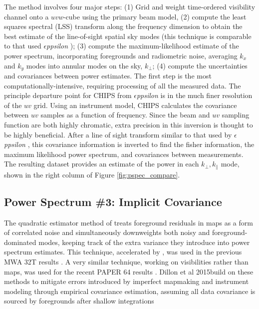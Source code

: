 \documentclass[preprint]{aastex}
\def\eppsilon{{\it $\epsilon$ppsilon }}
\def\dilloncite{Dillon et al 2015}
\begin{document}
The method involves four major steps: (1) Grid and weight time-ordered visibility channel onto a $uvw$-cube using the primary beam model, (2) compute the least squares spectral (LSS) transform along the frequency dimension to obtain the best estimate of the line-of-sight spatial sky modes (this technique is comparable to that used \eppsilon); (3) compute the maximum-likelihood estimate of the power spectrum, incorporating foregrounds and radiometric noise,  averaging $k_x$ and $k_y$ modes into annular modes on the sky, $k_\bot$; (4) compute the uncertainties and covariances between power estimates. The first step is the most computationally-intensive, requiring processing of all the measured data. The principle departure point for CHIPS from \eppsilon is in the much finer resolution of the $uv$ grid.  Using an instrument model, CHIPS calculates the covariance between $uv$ samples as a function of frequency.  Since the beam and $uv$ sampling function are both highly chromatic, extra precision in this inversion is thought to be highly beneficial. After a line of sight transform similar to that used by \eppsilon, this covariance information is inverted to find the fisher information, the maximum likelihood power spectrum, and covariances between measurements.  The resulting dataset provides an estimate of the power in each $k_\bot,k_\parallel$ mode, shown in the right column of Figure \ref{fig:pspec_compare}. 



\subsection{Power Spectrum \#3: Implicit Covariance}
\label{sec:empirical _cov}


The quadratic estimator method of \cite{Liu:2011p8763} treats foreground residuals in maps as a form of correlated noise and simultaneously downweights both noisy and foreground-dominated modes, keeping track of the extra variance they introduce into power spectrum estimates. This technique, accelerated by \cite{Dillon:2013p10497}, was used in the previous MWA 32T results \cite{Dillon:2014p9788}.  A very similar technique, working on visibilities rather than maps, was used for the recent PAPER 64 results  \cite{2015arXiv150206016A}.  \dilloncite build on these methods to mitigate errors introduced by imperfect mapmaking and instrument modeling through empirical covariance estimation, assuming all data covariance is sourced by foregrounds after shallow integrations
\end{document}
